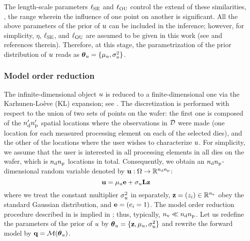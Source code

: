 The length-scale parameters $\ell_{\text{SE}}$ and $\ell_{\text{OU}}$ control the extend of these similarities, \ie, the range wherein the influence of one point on another is significant. All the above parameters of the prior of $u$ can be included in the inference; however, for simplicity, $\eta$, $\ell_{\text{SE}}$, and $\ell_{\text{OU}}$ are assumed to be given in this work (see \cite{marzouk2009} and references therein). Therefore, at this stage, the parametrization of the prior distribution of $u$ reads as ${\boldsymbol\theta}_u = \{ \mu_u, \sigma_u^2 \}$.

\subsubsection{Model order reduction} 
The infinite-dimensional object $u$ is reduced to a finite-dimensional one via the Karhunen-Lo\`{e}ve (KL) expansion; see . The discretization is performed with respect to the union of two sets of points on the wafer: the first one is composed of the ${n_\text{d}'} {n_\text{p}'}$ spatial locations where the observations in $\mathcal{D}$ were made (one location for each measured processing element on each of the selected dies), and the other of the locations where the user wishes to characterize $u$. For simplicity, we assume that the user is interested in all processing elements in all dies on the wafer, which is ${n_\text{d}} {n_\text{p}}$ locations in total. Consequently, we obtain an ${n_\text{d}} {n_\text{p}}$-dimensional random variable denoted by $\mathbf{u}: \Omega \to \mathbb{R}^{{n_\text{d}} {n_\text{p}}}$:
\begin{equation} \elabel{kl-approximation}
  \vu = \mu_\u \vI + \sigma_\u \mKL \vz
\end{equation}
where we treat the constant multiplier $\sigma^2_u$ in  separately, $\mathbf{z} = (z_i) \in \mathbb{R}^{n_\text{v}}$ obey the standard Gaussian distribution, and $\mathbf{e} = (e_i = 1)$. The model order reduction procedure described in  is implied in ; thus, typically, ${n_\text{v}} \ll {n_\text{d}} {n_\text{p}}$. Let us redefine the parameters of the prior of $u$ by ${\boldsymbol\theta}_u = \{ \mathbf{z}, \mu_u, \sigma^2_u \}$ and rewrite the forward model by $\mvT = \model{\vparam_\u}$.

